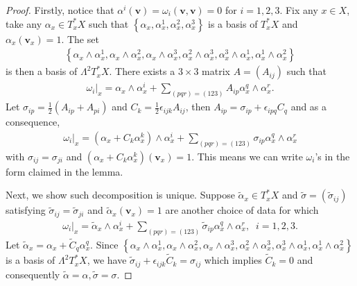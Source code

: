 \documentclass[11pt]{amsart}
\theoremstyle{plain}
\theoremstyle{definition}
\theoremstyle{plain}
\theoremstyle{definition}
\numberwithin{equation}{section}
\numberwithin{theorem}{section}
\begin{document}
\begin{proof}Firstly, notice that $\alpha^i(\bm v)=\omega_i(\bm v,\bm v)=0$ for $i=1,2,3$. Fix any $x\in X$, take any $\alpha_x\in T^*_x X$ such that $\left\{\alpha_x, \alpha^1_x, \alpha^2_x,\alpha^3_x\right\}$ is a basis of $T^*_xX$ and $\alpha_x(\bm v_x)=1$. The set 
\begin{align*}
\left\{\alpha_x\wedge\alpha^1_x, \alpha_x\wedge\alpha^2_x, \alpha_x\wedge\alpha^3_x, \alpha^2_x\wedge\alpha^3_x, \alpha^3_x\wedge\alpha^1_x, \alpha^1_x\wedge\alpha^2_x\right\}
\end{align*}
is then a basis of $\Lambda^2T^*_xX$. There exists a $3\times 3$ matrix $A=\left(A_{ij}\right)$ such that
\begin{align*}
\omega_i|_x = \alpha_x\wedge \alpha^i_x + \sum_{(pqr)=(123)} A_{ip}\alpha^q_x\wedge \alpha^r_x.
\end{align*}
Let $\sigma_{ip}=\frac{1}{2}\left( A_{ip}+A_{pi}\right)$ and $C_k=\frac{1}{2}\epsilon_{ijk}A_{ij}$, then $A_{ip}=\sigma_{ip} + \epsilon_{ipq}C_q$ and as a consequence,
\begin{align*}
\omega_i|_x = \left(\alpha_x + C_k \alpha^k_x\right)\wedge \alpha^i_x + \sum_{(pqr)=(123)} \sigma_{ip}\alpha^q_x\wedge \alpha^r_x
\end{align*}
with $\sigma_{ij}=\sigma_{ji}$ and $\left(\alpha_x + C_k \alpha^k_x\right)(\bm v_x)=1$. This means we can write $\omega_i$'s in the  form claimed in the lemma. 

Next, we show such decomposition is unique. Suppose $\widetilde\alpha_x\in T^*_x X$ and $\widetilde{\sigma}=\left(\widetilde\sigma_{ij}\right)$ satisfying $\widetilde\sigma_{ij}=\widetilde\sigma_{ji}$ and $\widetilde\alpha_x\left(\bm v_x\right)=1$ are another choice of data for which 
\begin{align*}
\omega_i|_x = \widetilde\alpha_x\wedge \alpha^i_x + \sum_{(pqr)=(123)} \widetilde\sigma_{ip}\alpha^q_x\wedge\alpha^r_x, \;\; i=1,2,3.
\end{align*}
Let $\widetilde\alpha_x=\alpha_x + \widetilde{C}_q\alpha^q_x$. Since $\left\{\alpha_x\wedge\alpha^1_x, \alpha_x\wedge\alpha^2_x, \alpha_x\wedge\alpha^3_x, \alpha^2_x\wedge\alpha^3_x, \alpha^3_x\wedge\alpha^1_x, \alpha^1_x\wedge\alpha^2_x\right\}$ is a basis of $\Lambda^2T^*_xX$, we have $\widetilde\sigma_{ij}+\epsilon_{ijk}\widetilde{C}_k=\sigma_{ij}$ which implies $\widetilde C_k=0$ and consequently $\widetilde\alpha=\alpha, \widetilde\sigma=\sigma$. 
\end{proof}
\end{document}
